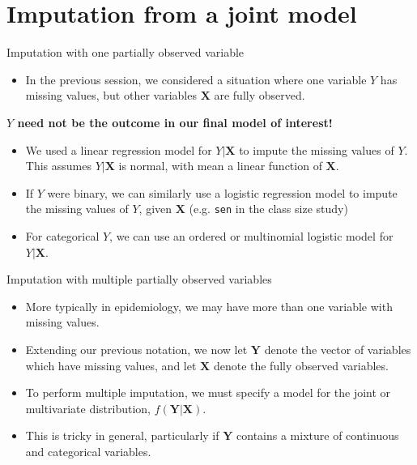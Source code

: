 \documentclass[ignorenonframetext,]{beamer}
\providecommand{\tightlist}{%
  \setlength{\itemsep}{0pt}\setlength{\parskip}{0pt}}
\begin{document}
\hypertarget{imputation-from-a-joint-model}{%
\section{Imputation from a joint
model}\label{imputation-from-a-joint-model}}

\begin{frame}[fragile]{Imputation with one partially observed variable}
\protect\hypertarget{imputation-with-one-partially-observed-variable}{}

\begin{itemize}
\tightlist
\item
  In the previous session, we considered a situation where one variable
  \(Y\) has missing values, but other variables \(\mathbf X\) are fully
  observed.
\end{itemize}

\textbf{\(Y\) need not be the outcome in our final model of interest!}

\begin{itemize}
\tightlist
\item
  We used a linear regression model for \(Y|\mathbf X\) to impute the
  missing values of \(Y\). This assumes \(Y|\mathbf X\) is normal, with
  mean a linear function of \(\mathbf X\).
\item
  If \(Y\) were binary, we can similarly use a logistic regression model
  to impute the missing values of \(Y\), given \(\mathbf X\) (e.g.
  \texttt{sen} in the class size study)
\item
  For categorical \(Y\), we can use an ordered or multinomial logistic
  model for \(Y|\mathbf X\).
\end{itemize}

\end{frame}

\begin{frame}{Imputation with multiple partially observed variables}
\protect\hypertarget{imputation-with-multiple-partially-observed-variables}{}

\begin{itemize}
\tightlist
\item
  More typically in epidemiology, we may have more than one variable
  with missing values.
\item
  Extending our previous notation, we now let \(\mathbf Y\) denote the
  vector of variables which have missing values, and let \(\mathbf X\)
  denote the fully observed variables.
\item
  To perform multiple imputation, we must specify a model for the joint
  or multivariate distribution, \(f(\mathbf Y|\mathbf X)\).
\item
  This is tricky in general, particularly if \(\mathbf Y\) contains a
  mixture of continuous and categorical variables.
\end{itemize}

\end{frame}
\end{document}
